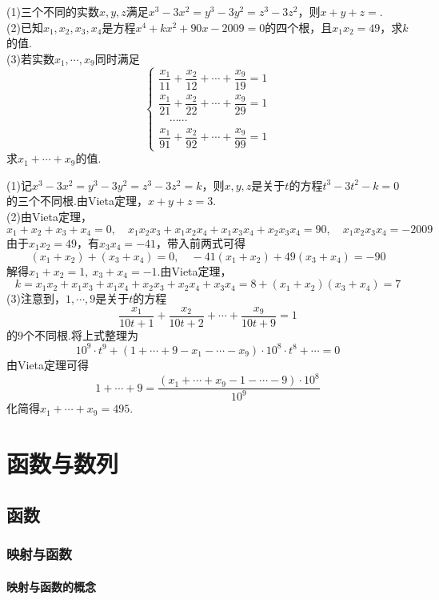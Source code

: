 \documentclass[lang=cn, zihao=5]{elegantbook}
\newcommand{\tk}{\uline{\hspace{4em}}}
\begin{document}
\begin{example}
	(1)三个不同的实数$x,y,z$满足$x^3-3x^2=y^3-3y^2=z^3-3z^2$，则$x+y+z=$\tk . \\
	(2)已知$x_1,x_2,x_3,x_4$是方程$x^4+kx^2+90x-2009=0$的四个根，且$x_1x_2=49$，求$k$的值. \\
	(3)若实数$x_1, \cdots ,x_9$同时满足$$\begin{cases}
		\dfrac{x_1}{11} + \dfrac{x_2}{12} + \cdots + \dfrac{x_9}{19} = 1 \\
		\dfrac{x_1}{21} + \dfrac{x_2}{22} + \cdots + \dfrac{x_9}{29} = 1 \\ 
		\quad \cdots \cdots \\
		\dfrac{x_1}{91} + \dfrac{x_2}{92} + \cdots + \dfrac{x_9}{99} = 1
	\end{cases}$$
	求$x_1+ \cdots + x_9$的值.
\end{example}
\begin{solution}
	(1)记$x^3-3x^2=y^3-3y^2=z^3-3z^2=k$，则$x,y,z$是关于$t$的方程$t^3-3t^2-k=0$的三个不同根.由Vieta定理，$x+y+z=3$. \\
	(2)由Vieta定理，$$x_1+x_2+x_3+x_4=0,\quad x_1x_2x_3+x_1x_2x_4+x_1x_3x_4+x_2x_3x_4=90,\quad x_1x_2x_3x_4=-2009$$
	由于$x_1x_2=49$，有$x_3x_4=-41$，带入前两式可得$$(x_1+x_2)+(x_3+x_4)=0,\quad -41(x_1+x_2)+49(x_3+x_4)=-90$$
	解得$x_1+x_2=1,~x_3+x_4=-1$.由Vieta定理，$$k=x_1x_2+x_1x_3+x_1x_4+x_2x_3+x_2x_4+x_3x_4=8+(x_1+x_2)(x_3+x_4)=7$$
	(3)注意到，$1, \cdots ,9$是关于$t$的方程$$\frac{x_1}{10t+1} + \frac{x_2}{10t+2} + \cdots + \frac{x_9}{10t+9} = 1$$
	的$9$个不同根.将上式整理为$$10^9 \cdot t^{9} + (1 + \cdots + 9 - x_1 - \cdots - x_9) \cdot 10^8 \cdot t^{8} + \cdots = 0$$
	由Vieta定理可得$$1+\cdots +9 = \frac{(x_1 + \cdots + x_9 - 1 - \cdots - 9) \cdot 10^8}{10^9}$$
	化简得$x_1 + \cdots + x_9 = 495$.
\end{solution}

\part{函数与数列}

\chapter{函数}

\section{映射与函数}

\subsection{映射与函数的概念}
\end{document}
